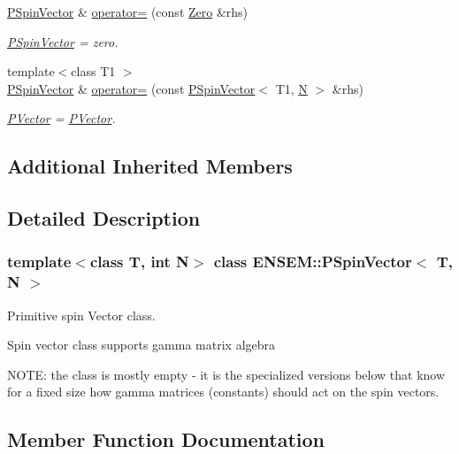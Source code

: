 \begin{DoxyCompactItemize}
\mbox{\hyperlink{classENSEM_1_1PSpinVector}{P\+Spin\+Vector}} \& \mbox{\hyperlink{classENSEM_1_1PSpinVector_aff99857da5f6f68093f04c9df5355e84}{operator=}} (const \mbox{\hyperlink{structENSEM_1_1Zero}{Zero}} \&rhs)
\begin{DoxyCompactList}\small\item\em \mbox{\hyperlink{classENSEM_1_1PSpinVector}{P\+Spin\+Vector}} = zero. \end{DoxyCompactList}\item 
{\footnotesize template$<$class T1 $>$ }\\\mbox{\hyperlink{classENSEM_1_1PSpinVector}{P\+Spin\+Vector}} \& \mbox{\hyperlink{classENSEM_1_1PSpinVector_a6c7a984a7ab5ad8939e0a9bc57a93660}{operator=}} (const \mbox{\hyperlink{classENSEM_1_1PSpinVector}{P\+Spin\+Vector}}$<$ T1, \mbox{\hyperlink{adat__devel_2lib_2hadron_2operator__name__util_8cc_a7722c8ecbb62d99aee7ce68b1752f337}{N}} $>$ \&rhs)
\begin{DoxyCompactList}\small\item\em \mbox{\hyperlink{classENSEM_1_1PVector}{P\+Vector}} = \mbox{\hyperlink{classENSEM_1_1PVector}{P\+Vector}}. \end{DoxyCompactList}\end{DoxyCompactItemize}
\subsection*{Additional Inherited Members}


\subsection{Detailed Description}
\subsubsection*{template$<$class T, int N$>$\newline
class E\+N\+S\+E\+M\+::\+P\+Spin\+Vector$<$ T, N $>$}

Primitive spin Vector class. 

Spin vector class supports gamma matrix algebra

N\+O\+TE\+: the class is mostly empty -\/ it is the specialized versions below that know for a fixed size how gamma matrices (constants) should act on the spin vectors. 

\subsection{Member Function Documentation}
\mbox{\label{classENSEM_1_1PSpinVector_aff99857da5f6f68093f04c9df5355e84}} 

